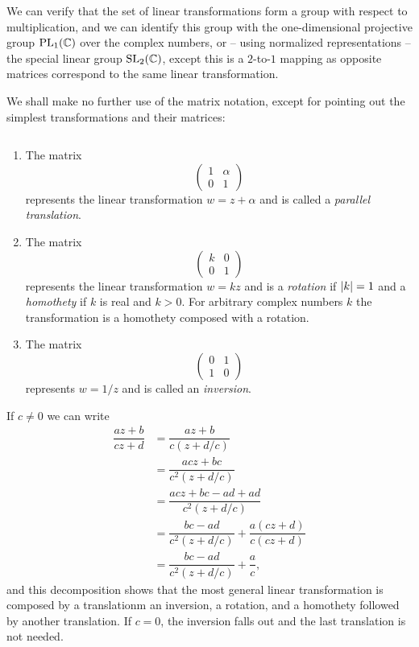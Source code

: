 We can verify that the set of linear transformations form a group with respect to multiplication, and we can identify this group with the one-dimensional projective group $\text{PL}_1(\mathbb C)$ over the complex numbers, or -- using normalized representations -- the special linear group $\text{SL}_2(\mathbb C)$, except this is a $2$-to-$1$ mapping as opposite matrices correspond to the same linear transformation.

We shall make no further use of the matrix notation, except for pointing out the simplest transformations and their matrices:
\begin{example}
	$ $
	\begin{enumerate}
		\item The matrix $$\begin{pmatrix}
			1 & \alpha \\
			0 & 1
		\end{pmatrix}$$ represents the linear transformation $w=z+\alpha$ and is called a \emph{parallel translation}.
		\item The matrix $$\begin{pmatrix}
			k & 0 \\
			0 & 1
		\end{pmatrix}$$ represents the linear transformation $w=kz$ and is a \emph{rotation} if $\lvert k \rvert=1$ and a \emph{homothety} if $k$ is real and $k>0$. For arbitrary complex numbers $k$ the transformation is a homothety composed with a rotation.
		\item The matrix $$\begin{pmatrix}
			0 & 1 \\
			1 & 0
		\end{pmatrix}$$ represents $w=1/z$ and is called an \emph{inversion}.
	\end{enumerate}
\end{example}

If $c \neq 0$ we can write 
\begin{align*}
\dfrac{az+b}{cz+d} &=\dfrac{az+b}{c\left(z+d/c\right)} \\
&=\dfrac{acz+bc}{c^2(z+d/c)} \\
&=\dfrac{acz+bc-ad+ad}{c^2(z+d/c)} \\
&=\dfrac{bc-ad}{c^2(z+d/c)}+\dfrac{a(cz+d)}{c(cz+d)} \\
&=\dfrac{bc-ad}{c^2(z+d/c)}+\dfrac{a}{c},
\end{align*}
and this decomposition shows that the most general linear transformation is composed by a translationm an inversion, a rotation, and a homothety followed by another translation. If $c=0$, the inversion falls out and the last translation is not needed.

